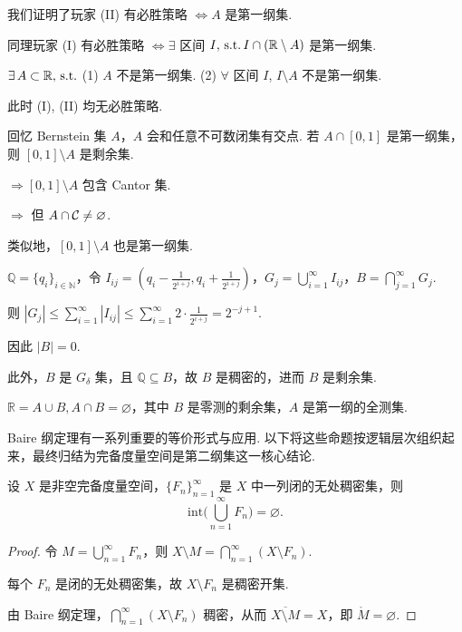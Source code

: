我们证明了玩家 (II) 有必胜策略 $\iff A$ 是第一纲集.\par
同理玩家 (I) 有必胜策略 $\iff \exists$ 区间 $I, \operatorname{\,\text{s.t.}} I \cap (\mathbb{R} \setminus A)$ 是第一纲集.\par
\begin{remark}
    $\exists\, A \subset \mathbb{R}, \operatorname{\,\text{s.t.}}$ (1) $A$ 不是第一纲集. (2) $\forall$ 区间 $I$, $I \setminus A$ 不是第一纲集.\par
此时 (I), (II) 均无必胜策略.
\end{remark}

回忆 Bernstein 集 $A$，$A$ 会和任意不可数闭集有交点. 
若 $A \cap [0, 1]$ 是第一纲集，则 $[0, 1] \setminus A$ 是剩余集.\par
$\Rightarrow [0, 1] \setminus A$ 包含 Cantor 集. \par
$\Rightarrow$ 但 $A \cap \mathcal{C} \neq \varnothing$. \par
类似地，$[0, 1] \setminus A$ 也是第一纲集.

\begin{instance}
    $\mathbb{Q} = \{q_i\}_{i\in\mathbb{N}}$，令 $I_{ij} = \left(q_i - \frac{1}{2^{i+j}}, q_i + \frac{1}{2^{i+j}}\right)$，$G_j = \bigcup_{i=1}^\infty I_{ij}$，$B = \bigcap_{j=1}^\infty G_j$.\par
    则 $|G_j| \leq \sum_{i=1}^\infty |I_{ij}| \leq \sum_{i=1}^\infty 2 \cdot \frac{1}{2^{i+j}} = 2^{-j+1}$.\par
    因此 $|B| = 0$.\par
    此外，$B$ 是 $G_\delta$ 集，且 $\mathbb{Q} \subseteq B$，故 $B$ 是稠密的，进而 $B$ 是剩余集.
\end{instance}

\begin{corollary}
    $\mathbb{R} = A \cup B, A \cap B = \varnothing$，其中 $B$ 是零测的剩余集，$A$ 是第一纲的全测集.
\end{corollary}

\medskip
Baire 纲定理有一系列重要的等价形式与应用. 以下将这些命题按逻辑层次组织起来，最终归结为完备度量空间是第二纲集这一核心结论.

\begin{lemma}
    设 $X$ 是非空完备度量空间，$\{F_n\}_{n=1}^\infty$ 是 $X$ 中一列闭的无处稠密集，则
    \begin{equation*}
        \mathrm{int}\biggl( \bigcup_{n=1}^\infty F_n \biggr) = \varnothing.
    \end{equation*}
\end{lemma}
\begin{proof}
    令 $M = \bigcup_{n=1}^\infty F_n$，则 $X \setminus M = \bigcap_{n=1}^\infty (X \setminus F_n)$. \par
    每个 $F_n$ 是闭的无处稠密集，故 $X \setminus F_n$ 是稠密开集.\par
    由 Baire 纲定理，$\bigcap_{n=1}^\infty (X \setminus F_n)$ 稠密，从而 $\overline{X \setminus M} = X$，即 $\mathring{M} = \varnothing$.
\end{proof}

